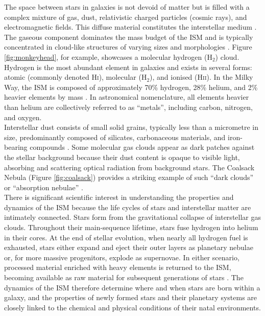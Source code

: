 The space between stars in galaxies is not devoid of matter but is filled with a complex mixture of gas, dust, relativistic charged particles (cosmic rays), and electromagnetic fields. This diffuse material constitutes the interstellar medium \citep{ISF2011, Ferriere_2001}.\\\indent
The gaseous component dominates the mass budget of the ISM and is typically concentrated in cloud-like structures of varying sizes and morphologies \citep{ISF2011}. Figure \ref{fig:monkeyhead}, for example, showcases a molecular hydrogen (H$_2$) cloud. Hydrogen is the most abundant element in galaxies and exists in several forms: atomic (commonly denoted \textrm{H\textsc{i}}), molecular (H$_2$), and ionised (H\textsc{ii}). In the Milky Way, the ISM is composed of approximately 70\% hydrogen, 28\% helium, and 2\% heavier elements by mass \citep{Ferriere_2001}. In astronomical nomenclature, all elements heavier than helium are collectively referred to as ``metals'', including carbon, nitrogen, and oxygen.\\\indent
Interstellar dust consists of small solid grains, typically less than a micrometre in size, predominantly composed of silicates, carbonaceous materials, and iron-bearing compounds \citep{Zhukovska_2008}. Some molecular gas clouds appear as dark patches against the stellar background because their dust content is opaque to visible light, absorbing and scattering optical radiation from background stars. The Coalsack Nebula (Figure \ref{fig:coalsack}) provides a striking example of such ``dark clouds'' or ``absorption nebulae'' \citep{ISF2011}.\\\indent
There is significant scientific interest in understanding the properties and dynamics of the ISM because the life cycles of stars and interstellar matter are intimately connected. Stars form from the gravitational collapse of interstellar gas clouds. Throughout their main-sequence lifetime, stars fuse hydrogen into helium in their cores. At the end of stellar evolution, when nearly all hydrogen fuel is exhausted, stars either expand and eject their outer layers as planetary nebulae or, for more massive progenitors, explode as supernovae. In either scenario, processed material enriched with heavy elements is returned to the ISM, becoming available as raw material for subsequent generations of stars \citep{ISF2011}. The dynamics of the ISM therefore determine where and when stars are born within a galaxy, and the properties of newly formed stars and their planetary systems are closely linked to the chemical and physical conditions of their natal environments.


